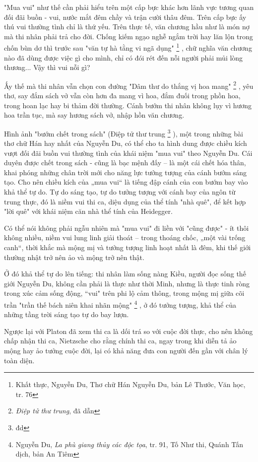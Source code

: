 \documentclass[../main.tex]{subfiles}
\begin{document}
\begin{multicols}{2}
"Mua vui" như thế cần phải hiểu trên một cấp bực khác hơn lãnh vực tương quan đối đãi buồn - vui, nước mắt đêm chầy và trận cười thâu đêm. Trên cấp bực ấy thú vui thường tình chỉ là thứ yếu. Trên thực tế, văn chương hầu như là món nợ mà thi nhân phải trả cho đời. Chống kiếm ngạo nghễ ngắm trời hay lăn lộn trong chốn bùn dơ thì trước sau "văn tự hà tằng vi ngã dụng" \footnote{
Khất thực, Nguyễn Du, Thơ chữ Hán Nguyễn Du, bản Lê Thước, Văn học, tr. 76} , chữ nghĩa văn chương nào đã dùng được việc  gì cho mình, chỉ có đói rét đến nỗi người phải mủi lòng thương... Vậy thì vui nỗi gì?  
 
Ấy thế mà thi nhân vẫn chọn con đường "Dâm thư do thắng vị hoa mang" \footnote{
\textit{Điệp tử thư trung}, đã dẫn} , yêu thơ, say đắm sách vở vẫn còn hơn đa mang vì hoa, đắm đuối trong phồn hoa, trong hoan lạc hay bi thảm đời thường. Cánh bướm thi nhân không lụy vì hương hoa trần tục, mà say hương sách vở, nhập hồn văn chương.  
 
Hình ảnh "bướm chết trong sách" (Điệp tử thư trung \footnote{
đd} ), một trong những bài thơ chữ Hán hay nhất của Nguyễn Du, có thể cho ta hình dung được chiều kích vượt đối đãi buồn vui thường tình của khái niệm "mua vui" theo Nguyễn Du. Cái duyên được chết trong sách - cũng là bạc mệnh đấy – là một cái chết hóa thân, khai phóng những chân trời mới cho năng lực tưởng tượng của cánh bướm sáng tạo. Cho nên chiều kích của „mua vui“ là tiếng đập cánh của con bướm bay vào khả thể tự do. Tự do sáng tạo, tự do tưởng tượng với cánh bay của ngôn từ trung thực, đó là niềm vui thi ca, diệu dụng của thể tính "nhà quê", để kết hợp "lời quê" với khái niệm căn nhà thể tính của Heidegger.  
 
Có thể nói không phải ngẫu nhiên mà "mua vui" đi liền với "cũng được" - ít thôi không nhiều, niềm vui lung linh giải thoát – trong  thoáng chốc, „một vài trống canh“, thời khắc mà mộng mị và tưởng tượng linh hoạt nhất là đêm, khi thế giới thường nhật trở nên ảo và mộng trở nên thật.   
 
Ở đó khả  thể tự do lên tiếng: thi nhân làm sống nàng Kiều, người đọc sống thế giới Nguyễn Du, không cần phải là thực như thời Minh, nhưng là thực tinh ròng trong xúc cảm sống động, “vui" trên phi lộ cảm thông, trong mộng mị giữa cõi trần "trần thế bách niên khai nhãn mộng" \footnote{
Nguyễn Du, \textit{La phù giang thủy các độc tọa}, tr. 91, Tố Như thi, Quánh Tấn dịch, bản An Tiêm} , ở đó tưởng tượng, khả thể của những tầng trời sáng tạo tự do bay lượn.    
 
Ngược lại với Platon đã xem thi ca là dối trá so với cuộc đời thực, cho nên không chấp nhận thi ca, Nietzsche cho rằng chính thi ca, ngay trong khi diễn tả ảo mộng hay ảo tưởng cuộc đời, lại có khả năng  đưa con người đến gần với chân lý toàn diện.  
 

\end{multicols}
\end{document}
